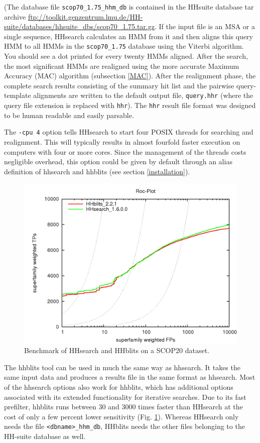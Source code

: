 \documentclass[11pt,a4paper]{article}
\begin{document}
(The database file \verb`scop70_1.75_hhm_db` is contained in the HHsuite database tar 
archive \url{ftp://toolkit.genzentrum.lmu.de/HH-suite/databases/hhsuite_dbs/scop70_1.75.tar.gz}. 
If the input file is an MSA or a single sequence, HHsearch calculates an HMM from it
and then aligns this query HMM to all HMMs in the \verb`scop70_1.75` database using the Viterbi 
algorithm. You should see a dot printed for every twenty HMMs aligned. After the search, 
the most significant HMMs are realigned using the more accurate Maximum Accuracy (MAC) 
algorithm (subsection \ref{MAC}). After the realignment phase, the complete search results consisting of the 
summary hit list and the pairwise query-template alignments are written to the default 
output file, \verb`query.hhr` (where the query file extension is replaced with \verb`hhr`). 
The \verb`hhr` result file format was designed to be human readable and easily parsable.

The \verb`-cpu 4` option tells HHsearch to start four POSIX threads for searching and realignment. This will typically results in almost fourfold faster execution on computers with four or more cores. Since the management of the threads costs negligible overhead, this option could be given by default through an alias definition of hhsearch and hhblits (see section \ref{installation}). 

\begin{figure}[h]
\begin{center}
\includegraphics[width=0.5 \textwidth]{hhblits-hhsearch.png}
\caption{Benchmark of HHsearch and HHblits on a SCOP20 dataset.}
\label{fig:hhsearch_hhblits_bench}
\end{center}
\end{figure}

The hhblits tool can be used in much the same way as hhsearch. 
It takes the same input data and produces a results file in the same format as hhsearch.
Most of the hhsearch options also work for hhblits, which has
additional options associated with its extended functionality for iterative searches. 
Due to its fast prefilter, hhblits runs between 30 and 3000 times faster than HHsearch
at the cost of only a few percent lower sensitivity (Fig. \ref{fig:hhsearch_hhblits_bench}).
Whereas HHsearch only needs the file \verb`<dbname>_hhm_db`, HHblits needs the other files
belonging to the HH-suite database as well. 
\end{document}
